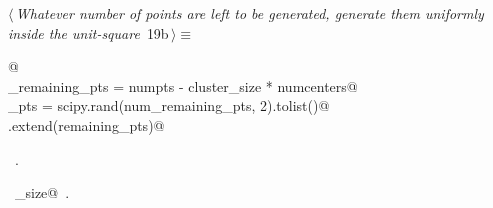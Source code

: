 \documentclass[11.5pt]{report}
\begin{document}
\vspace{-0.8cm} \newchunk
\begin{flushleft} \small
\begin{minipage}{\linewidth}\label{scrap21}\raggedright\small
{} $\langle\,${\itshape Whatever number of points are left to be generated, generate them uniformly inside the unit-square}\nobreak\ {\footnotesize {19b}}$\,\rangle\equiv$
\vspace{-1ex}
\begin{list}{}{} \item
\mbox{}\verb@   @\\
\mbox{}\verb@num_remaining_pts = numpts - cluster_size * numcenters@\\
\mbox{}\verb@remaining_pts = scipy.rand(num_remaining_pts, 2).tolist()@\\
\mbox{}\verb@points.extend(remaining_pts)@\\
\mbox{}\verb@@{\NWsep}
\end{list}
\vspace{-1.5ex}
\footnotesize
\begin{list}{}{\setlength{\itemsep}{-\parsep}\setlength{\itemindent}{-\leftmargin}}
\item \NWtxtMacroRefIn\ .
\item \NWtxtIdentsUsed\nobreak\  \verb@cluster_size@\nobreak\ .
\item{}
\end{list}
\end{minipage}\vspace{4ex}
\end{flushleft}
\end{document}
